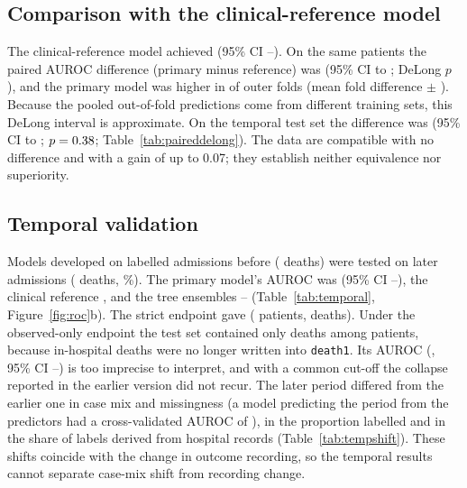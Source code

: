 \documentclass[preprint,10pt]{elsarticle}
\begin{document}
\subsection{Comparison with the clinical-reference model}
\label{sec:res-paired}
The clinical-reference model achieved \NestCR{} (95\% CI \NestCRLo--\NestCRHi). On the same patients the paired AUROC difference (primary minus reference) was \PairNestDiff{} (95\% CI \PairNestLo{} to \PairNestHi; DeLong $p$ \PairNestP), and the primary model was higher in \FoldLRBetter{} of \NFolds{} outer folds (mean fold difference \FoldDiffMean{} $\pm$ \FoldDiffSD). Because the pooled out-of-fold predictions come from different training sets, this DeLong interval is approximate. On the temporal test set the difference was \TPairDiff{} (95\% CI \TPairLo{} to \TPairHi; $p=0.38$; Table~\ref{tab:paireddelong}). The data are compatible with no difference and with a gain of up to 0.07; they establish neither equivalence nor superiority.



\subsection{Temporal validation}
\label{sec:res-temporal}
Models developed on \TNtr{} labelled admissions before \TCut{} (\TEtr{} deaths) were tested on \TNte{} later admissions (\TEte{} deaths, \TPrev\%). The primary model's AUROC was \TLR{} (95\% CI \TLRLo--\TLRHi), the clinical reference \TCR{}, and the tree ensembles \TEnsLo--\TEnsHi{} (Table~\ref{tab:temporal}, Figure~\ref{fig:roc}b). The strict endpoint gave \TStLR{} (\TStN{} patients, \TStE{} deaths). Under the observed-only endpoint the test set contained only \TObE{} deaths among \TObN{} patients, because in-hospital deaths were no longer written into \texttt{death1}. Its AUROC (\TObLR, 95\% CI \TObLRLo--\TObLRHi) is too imprecise to interpret, and with a common cut-off the collapse reported in the earlier version did not recur. The later period differed from the earlier one in case mix and missingness (a model predicting the period from the predictors had a cross-validated AUROC of \TMember), in the proportion labelled and in the share of labels derived from hospital records (Table~\ref{tab:tempshift}). These shifts coincide with the change in outcome recording, so the temporal results cannot separate case-mix shift from recording change.


\end{document}
